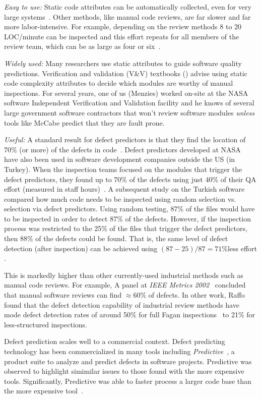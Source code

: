 {\em Easy to use:} Static code attributes can be automatically collected, even for very large systems~\cite{nagappan05}.
Other methods, like  manual code reviews, are far slower and far more labor-intensive.
For example, depending on the review methods 8 to 20 LOC/minute can be
inspected and this effort repeats for all members of the review team,
which can be as large as four or six~\cite{me02f}. 

{\em Widely used:} Many researchers use static attributes to guide software 
quality predictions.
Verification and validation (V\&V) textbooks
(\cite{rakitin01}) advise using static code complexity attributes
to decide which modules are worthy of manual inspections.  
For several  years, one of us (Menzies) worked on-site at the NASA software Independent Verification
and Validation facility
and he
knows of several large government software contractors that won't
review software modules {\em unless} tools like McCabe predict that
they are fault prone.  


{\em Useful:}
A
standard result for defect predictors is that they find the location of  70\% (or more)
of the defects in code~\cite{me70b}.
Defect predictors developed at NASA~\cite{me07b} have also been used in software development companies outside the US (in Turkey). When the inspection teams focused on the modules that trigger the defect predictors, they found up to 70\% of the defects using just 40\% of their QA effort (measured in staff hours)~\cite{tosun10}.
A subsequent study on the Turkish software
compared how much code needs to be inspected using
random selection vs. selection via defect
predictors. Using random testing, 87\% of the files
would have to be inspected in order to detect 87\%
of the defects. However, if the inspection process
was restricted to the 25\% of the files that trigger
the defect predictors, then 88\% of the defects
could be found. That is, the same level of defect
detection (after inspection) can be achieved using
$(87-25)/87=71$\%less effort
\cite{tosun09}.

This is markedly
higher than other currently-used
industrial
methods such as manual code reviews. For example, 
A panel at {\em IEEE Metrics
2002}~\cite{shu02} concluded that manual software  reviews can find ${\approx}60\%$ 
of defects.
In other work, 
Raffo found that the defect detection capability of
industrial review methods have mode defect detection rates
of around 50\%
 for full Fagan inspections~\cite{fagan76} to
21\% for less-structured inspections.

Defect prediction scales well to a commercial
context. Defect predicting technology has been
commercialized in many tools including {\it Predictive}~\cite{turner06}, a
 product suite to analyze and predict
defects in software projects. Predictive was observed to
highlight simimilar issues to those found   with the more expensive tools. Significantly,
Predictive was able to faster process a larger code
base than the more expensive tool~\cite{turner06}.


